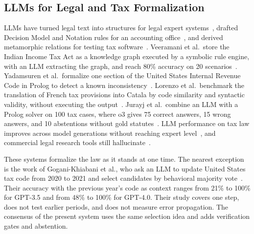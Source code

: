 \subsection{LLMs for Legal and Tax Formalization}
LLMs have turned legal text into structures for legal expert systems~\cite{janatian2023texttostructure}, drafted Decision Model and Notation rules for an accounting office~\cite{makowski2025dmn}, and derived metamorphic relations for testing tax software~\cite{srinivas2023fewshot,khiabani2026agentic}. Veeramani et al.\ store the Indian Income Tax Act as a knowledge graph executed by a symbolic rule engine, with an LLM extracting the graph, and reach 80\% accuracy on 20 scenarios~\cite{veeramani2026neurosymbolic}. Yadamsuren et al.\ formalize one section of the United States Internal Revenue Code in Prolog to detect a known inconsistency~\cite{yadamsuren2026formalization}. Lorenzo et al.\ benchmark the translation of French tax provisions into Catala by code similarity and syntactic validity, without executing the output~\cite{lorenzo2025translating}. Jurayj et al.\ combine an LLM with a Prolog solver on 100 tax cases, where o3 gives 75 correct answers, 15 wrong answers, and 10 abstentions without gold statutes~\cite{jurayj2026tax}. LLM performance on tax law improves across model generations without reaching expert level~\cite{blairstanek2023gpt3,nay2024taxattorneys}, and commercial legal research tools still hallucinate~\cite{magesh2025hallucination}.

These systems formalize the law as it stands at one time. The nearest exception is the work of Gogani-Khiabani et al., who ask an LLM to update United States tax code from 2020 to 2021 and select candidates by behavioral majority vote~\cite{goganikhiabani2025maintaining}. Their accuracy with the previous year's code as context ranges from 21\% to 100\% for GPT-3.5 and from 48\% to 100\% for GPT-4.0. Their study covers one step, does not test earlier periods, and does not measure error propagation. The consensus of the present system uses the same selection idea and adds verification gates and abstention.

